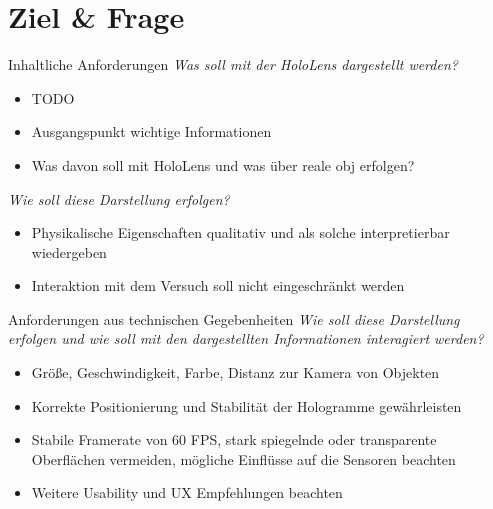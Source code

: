 \part{Ziel \& Frage}
\label{part:goal}

\begin{frame}[fragile]{Inhaltliche Anforderungen}
\textit{Was soll mit der HoloLens dargestellt werden?}
\begin{itemize}
	\item TODO
	\item Ausgangspunkt wichtige Informationen 
	\item Was davon soll mit HoloLens und was über reale obj erfolgen?
\end{itemize}
\textit{Wie soll diese Darstellung erfolgen?}
\begin{itemize}
	\item Physikalische Eigenschaften qualitativ und als solche interpretierbar wiedergeben
	\item Interaktion mit dem Versuch soll nicht eingeschränkt werden
\end{itemize}
\end{frame}


\begin{frame}[fragile]{Anforderungen aus technischen Gegebenheiten}
\textit{Wie soll diese Darstellung erfolgen und wie soll mit den dargestellten Informationen interagiert werden?}
\begin{itemize}
\item Größe, Geschwindigkeit, Farbe, Distanz zur Kamera von Objekten
\pause
\item Korrekte Positionierung und Stabilität der Hologramme gewährleisten
\pause
\item Stabile Framerate von 60 FPS, stark spiegelnde oder transparente Oberflächen vermeiden, mögliche Einflüsse auf die Sensoren beachten
\pause
\item Weitere Usability und UX Empfehlungen beachten
\end{itemize}
\end{frame}
